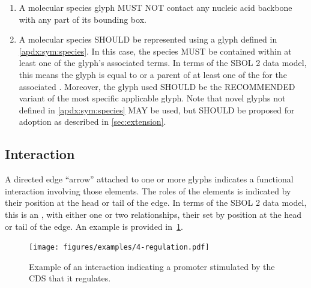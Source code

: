 \begin{enumerate}
\item A molecular species glyph MUST NOT contact any nucleic acid backbone with any part of its bounding box.
\item A molecular species SHOULD be represented using a glyph defined in \ref{apdx:sym:species}.  In this case, the species MUST be contained within at least one of the glyph's associated terms.
In terms of the SBOL 2 data model, this means the glyph is equal to or a parent of at least one of the  for the associated .
	Moreover, the glyph used SHOULD be the RECOMMENDED variant of the most specific applicable glyph.  Note that novel glyphs not defined in \ref{apdx:sym:species} MAY be used, but SHOULD be proposed for adoption as described in \ref{sec:extension}.
\end{enumerate}


\subsection{Interaction}

A directed edge ``arrow'' attached to one or more glyphs indicates a functional interaction involving those elements.
The roles of the elements is indicated by their position at the head or tail of the edge.
In terms of the SBOL 2 data model, this is an , with either one or two  relationships, their  set by position at the head or tail of the edge.
	An example is provided in~\ref{exa:4}.

	\begin{figure}[h!]
	\centering
	\texttt{[image: figures/examples/4-regulation.pdf]}
	\caption{Example of an interaction indicating a promoter stimulated by the CDS that it regulates.}
	\label{exa:4}
	\end{figure}
		
